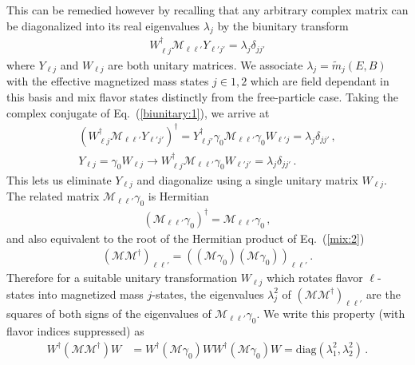\documentclass[addchapnum]{ws-rv961x669} %
\newcommand{\req}[1]{Eq.~(\ref{#1})}
\begin{document}
This can be remedied however by recalling that any arbitrary complex matrix can be diagonalized into its real eigenvalues $\lambda_{j}$ by the biunitary transform
\begin{align}
    \label{biunitary:1}
    W_{\ell j}^{\dag}\mathcal{M}_{\ell\ell'}Y_{\ell'j'}=\lambda_{j}\delta_{jj'}
\end{align}
where $Y_{\ell j}$ and $W_{\ell j}$ are both unitary matrices. We associate $\lambda_{j}=\widetilde m_{j}(E,B)$ with the effective magnetized mass states $j\in1,2$ which are field dependant in this basis and mix flavor states distinctly from the free-particle case. Taking the complex conjugate of \req{biunitary:1}, we arrive at
\begin{align}
    \label{biunitary:2}
    (W_{\ell j}^{\dag}\mathcal{M}_{\ell\ell'}Y_{\ell'j'})^{\dag} = 
    Y_{\ell j'}^{\dag}\gamma_{0}\mathcal{M}_{\ell\ell'}\gamma_{0}W_{\ell' j}=\lambda_{j}\delta_{jj'}\,,\\
    Y_{\ell j}=\gamma_{0}W_{\ell j}\rightarrow
    W_{\ell j}^{\dag}\mathcal{M}_{\ell\ell'}\gamma_{0}W_{\ell'j'}=\lambda_{j}\delta_{jj'}\,.    
\end{align}
This lets us eliminate $Y_{\ell j}$ and diagonalize using a single unitary matrix $W_{\ell j}$. The related matrix $\mathcal{M}_{\ell\ell'}\gamma_{0}$ is Hermitian
\begin{align}
    \label{herm:1}
    (\mathcal{M}_{\ell\ell'}\gamma_{0})^{\dag} = \mathcal{M}_{\ell\ell'}\gamma_{0}\,,
\end{align}
and also equivalent to the root of the Hermitian product of \req{mix:2}
\begin{align}
    (\mathcal{M}\mathcal{M}^{\dag})_{\ell\ell'} = \left((\mathcal{M}\gamma_{0})(\mathcal{M}\gamma_{0})\right)_{\ell\ell'}\,.
\end{align}
Therefore for a suitable unitary transformation $W_{\ell j}$ which rotates flavor $\ell$-states into magnetized mass $j$-states, the eigenvalues $\lambda_{j}^{2}$ of $(\mathcal{M}\mathcal{M}^{\dag})_{\ell\ell'}$ are the squares of both signs of the eigenvalues of $\mathcal{M}_{\ell\ell'}\gamma_{0}$. We write this property (with flavor indices suppressed) as
\begin{align}
    W^{\dag}(\mathcal{M}\mathcal{M}^{\dag})W &= W^{\dag}(\mathcal{M}\gamma_{0})WW^{\dag}(\mathcal{M}\gamma_{0})W = \mathrm{diag}(\lambda_{1}^{2},\lambda_{2}^{2})\,.
\end{align}
\end{document}
